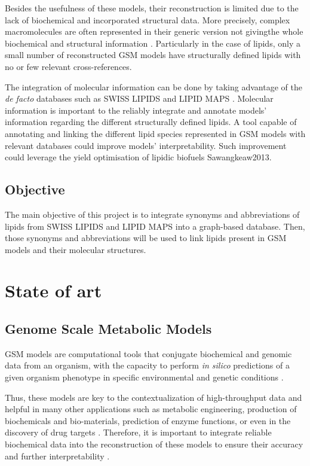 \documentclass{llncs}
\begin{document}
Besides the usefulness of these models, their reconstruction is limited due to the lack of biochemical and incorporated structural data.
More precisely, complex macromolecules are often represented in their generic version not givingthe whole biochemical and structural information \cite{Gu2019}.
Particularly in the case of lipids, only a small number of reconstructed GSM models have structurally defined lipids with no or few relevant cross-references. 

The integration of molecular information can be done by taking advantage of the  \emph{de facto} databases such as SWISS LIPIDS \cite{Aimo2015} and  LIPID MAPS \cite{Sud2007}.
Molecular information is important to the reliably integrate and annotate models' information regarding the different structurally defined lipids.
A tool capable of annotating and linking the different lipid species represented in GSM models with relevant databases could improve models' interpretability. Such improvement could leverage the yield optimisation of lipidic biofuels {Sawangkeaw2013}.




\subsection{Objective}

The main objective of this project is to integrate synonyms and abbreviations of lipids from SWISS LIPIDS and LIPID MAPS into a graph-based database. Then, those synonyms and abbreviations will be used to link lipids present in GSM models and their molecular structures.

\section{State of art}
\subsection{Genome Scale Metabolic Models}
GSM models are computational tools that conjugate biochemical and genomic data from an organism, with the capacity to perform \emph{in silico} predictions of a given organism phenotype in specific environmental and genetic conditions \cite{Rocha2007,Zhou2021}.

Thus, these models are key to the contextualization of high-throughput data and helpful in many other applications such as metabolic engineering, production of biochemicals and bio-materials, prediction of enzyme functions, or even in the discovery of drug targets \cite{Gu2019,Kim2017}.
Therefore, it is important to integrate reliable biochemical data into the reconstruction of these models to ensure their accuracy and further interpretability \cite{Moseley2021,Passi2021}. 
\end{document}
